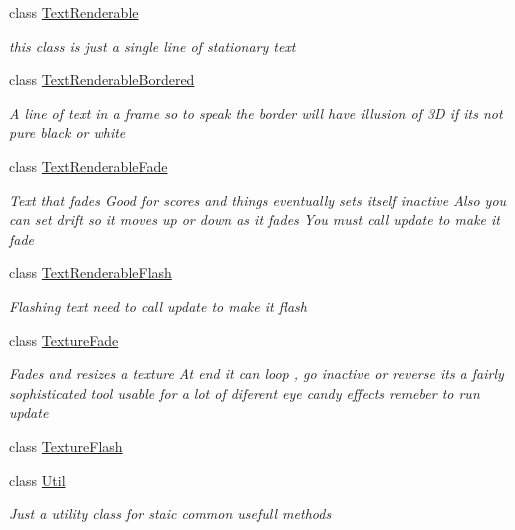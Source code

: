 \begin{DoxyCompactItemize}
class \mbox{\hyperlink{class_r_c___framework_1_1_text_renderable}{Text\+Renderable}}
\begin{DoxyCompactList}\small\item\em this class is just a single line of stationary text \end{DoxyCompactList}\item 
class \mbox{\hyperlink{class_r_c___framework_1_1_text_renderable_bordered}{Text\+Renderable\+Bordered}}
\begin{DoxyCompactList}\small\item\em A line of text in a frame so to speak the border will have illusion of 3D if its not pure black or white \end{DoxyCompactList}\item 
class \mbox{\hyperlink{class_r_c___framework_1_1_text_renderable_fade}{Text\+Renderable\+Fade}}
\begin{DoxyCompactList}\small\item\em Text that fades Good for scores and things eventually sets itself inactive Also you can set drift so it moves up or down as it fades You must call update to make it fade \end{DoxyCompactList}\item 
class \mbox{\hyperlink{class_r_c___framework_1_1_text_renderable_flash}{Text\+Renderable\+Flash}}
\begin{DoxyCompactList}\small\item\em Flashing text need to call update to make it flash \end{DoxyCompactList}\item 
class \mbox{\hyperlink{class_r_c___framework_1_1_texture_fade}{Texture\+Fade}}
\begin{DoxyCompactList}\small\item\em Fades and resizes a texture At end it can loop , go inactive or reverse its a fairly sophisticated tool usable for a lot of diferent eye candy effects remeber to run update \end{DoxyCompactList}\item 
class \mbox{\hyperlink{class_r_c___framework_1_1_texture_flash}{Texture\+Flash}}
\item 
class \mbox{\hyperlink{class_r_c___framework_1_1_util}{Util}}
\begin{DoxyCompactList}\small\item\em Just a utility class for staic common usefull methods \end{DoxyCompactList}\item 

\end{DoxyCompactItemize}
